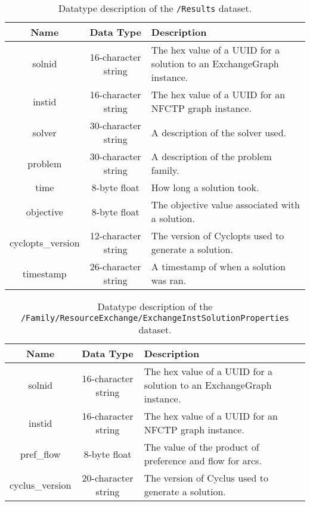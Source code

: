 \begin{table}[h!]
\centering
\label{tbl:/Results}
\caption{Datatype description of the \lstinline[basicstyle=\ttfamily\color{black}]|/Results| dataset.}
\begin{tabularx}{\columnwidth-10pt}{|c|c|X|} %
\hline
\textbf{Name} & \textbf{Data Type} & \textbf{Description}       \\ \hline
solnid & 16-character string & The hex value of a UUID for a solution to an ExchangeGraph instance. \\ \hline
instid & 16-character string & The hex value of a UUID for an NFCTP graph instance. \\ \hline
solver & 30-character string & A description of the solver used. \\ \hline
problem & 30-character string & A description of the problem family. \\ \hline
time & 8-byte float & How long a solution took. \\ \hline
objective & 8-byte float & The objective value associated with a solution. \\ \hline
cyclopts\_version & 12-character string & The version of Cyclopts used to generate a solution. \\ \hline
timestamp & 26-character string & A timestamp of when a solution was ran. \\ \hline
\end{tabularx}
\end{table}

\begin{table}[h!]
\centering
\label{tbl:/Family/ResourceExchange/ExchangeInstSolutionProperties}
\caption{Datatype description of the \lstinline[basicstyle=\ttfamily\color{black}]|/Family/ResourceExchange/ExchangeInstSolutionProperties| dataset.}
\begin{tabularx}{\columnwidth-10pt}{|c|c|X|} %
\hline
\textbf{Name} & \textbf{Data Type} & \textbf{Description}       \\ \hline
solnid & 16-character string & The hex value of a UUID for a solution to an ExchangeGraph instance. \\ \hline
instid & 16-character string & The hex value of a UUID for an NFCTP graph instance. \\ \hline
pref\_flow & 8-byte float & The value of the product of preference and flow for arcs. \\ \hline
cyclus\_version & 20-character string & The version of Cyclus used to generate a solution. \\ \hline
\end{tabularx}
\end{table}

